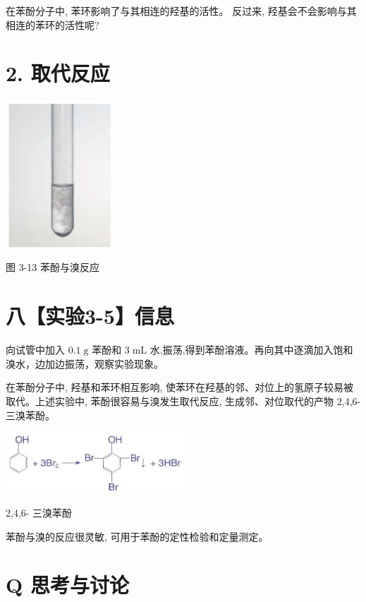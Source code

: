\documentclass[10pt]{article}
\begin{document}
在苯酚分子中, 苯环影响了与其相连的羟基的活性。 反过来, 羟基会不会影响与其相连的苯环的活性呢?

\section*{2. 取代反应}

\begin{center}
\includegraphics[max width=0.3\textwidth]{images/0190efc5-b58a-7c43-bfb0-e0a030df9cfd_70_343057.jpg}
\end{center}

图 3-13 苯酚与溴反应

\section*{八【实验3-5】信息}

向试管中加入 \({0.1}\mathrm{\;g}\) 苯酚和 \(3\mathrm{\;{mL}}\) 水,振荡,得到苯酚溶液。再向其中逐滴加入饱和溴水，边加边振荡，观察实验现象。

在苯酚分子中, 羟基和苯环相互影响, 使苯环在羟基的邻、对位上的氢原子较易被取代。上述实验中, 苯酚很容易与溴发生取代反应, 生成邻、对位取代的产物 2,4,6- 三溴苯酚。

\begin{center}
\includegraphics[max width=0.5\textwidth]{images/0190efc5-b58a-7c43-bfb0-e0a030df9cfd_70_271157.jpg}
\end{center}

2,4,6- 三溴苯酚

苯酚与溴的反应很灵敏, 可用于苯酚的定性检验和定量测定。

\section*{Q 思考与讨论}
\end{document}
